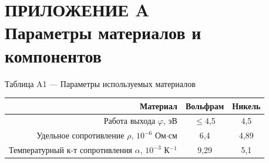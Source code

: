 \documentclass[a4paper, 14pt]{extarticle}
\begin{document}
	\section*{ПРИЛОЖЕНИЕ A \\ Параметры материалов и компонентов}
		
		
		\hspace{11mm} Таблица A1 --- Параметры используемых материалов
		\begin{table}[h!]
		\centering
		\begin{tabular}{|r|c|c|}
			\hline
			Материал & Вольфрам & Никель \\
			\hline
			Работа выхода $\varphi$, эВ & $\leq$4,5  & 4,5  \\
			\hline
			
			Удельное сопротивление $\rho$, $10^{-6}$ Ом$\cdot$см  & 6,4 & 4,89\\
			\hline
			Температурный к-т сопротивления $\alpha$, $10^{-3}$ К$^{-1}$& 9,29 & 5,1\\
			\hline
		\end{tabular}
	\end{table}
		
\end{document}
